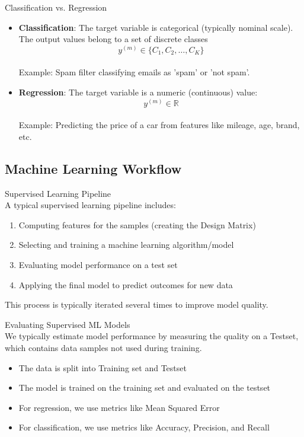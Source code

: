 \begin{definition}{Classification vs. Regression}
\begin{itemize}
    \item \textbf{Classification}: The target variable is categorical (typically nominal scale). 
    The output values belong to a set of discrete classes $$y^{(m)} \in \{C_1, C_2, \ldots, C_K\}$$ 
    \\ Example: Spam filter classifying emails as 'spam' or 'not spam'.
    \vspace{-2mm}\\
    \item \textbf{Regression}: The target variable is a numeric (continuous) value: $$y^{(m)} \in \mathbb{R}$$
    \\ Example: Predicting the price of a car from features like mileage, age, brand, etc.
\end{itemize}
\end{definition}

\multend

\subsection{Machine Learning Workflow}

\begin{concept}{Supervised Learning Pipeline}\\
A typical supervised learning pipeline includes:
\begin{enumerate}
    \item Computing features for the samples (creating the Design Matrix)
    \item Selecting and training a machine learning algorithm/model
    \item Evaluating model performance on a test set
    \item Applying the final model to predict outcomes for new data
\end{enumerate}
This process is typically iterated several times to improve model quality.
\end{concept}

\begin{definition}{Evaluating Supervised ML Models}\\
We typically estimate model performance by measuring the quality on a Testset, which contains data samples not used during training.
\begin{itemize}
    \item The data is split into Training set and Testset
    \item The model is trained on the training set and evaluated on the testset
    \item For regression, we use metrics like Mean Squared Error
    \item For classification, we use metrics like Accuracy, Precision, and Recall
\end{itemize}
\end{definition}

